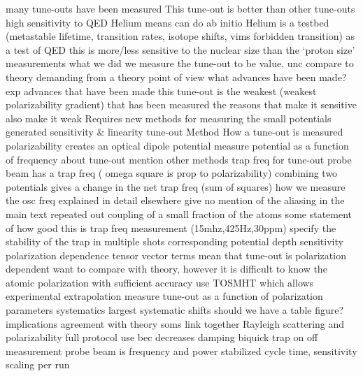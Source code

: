 \documentclass[aps,prl,
,reprint,
superscriptaddress,
onecolumn,
showpacs,preprintnumbers,
 amsmath,amssymb,
]{revtex4-1}
\begin{document}
\begin{outline}[enumerate]
    \2 many tune-outs have been measured
    \2 This tune-out is better than other tune-outs
        \3 high sensitivity to QED
        \3 Helium means can do ab initio
            \4 Helium is a testbed (metastable lifetime, transition rates, isotope shifts, vims forbidden transition)
        \3 as a test of QED this is more/less sensitive to the nuclear size than the `proton size' measurements
\1 what we did
    \2 we measure the tune-out to be
        \3 value, unc
        \3 compare to theory
    \2 demanding from a theory point of view
        \3 what advances have been made?
    \2 exp advances that have been made
        \3 this tune-out is the weakest (weakest polarizability gradient) that has been measured
        \3 the reasons that make it sensitive also make it weak
        \3 Requires new methods for measuring the small potentials generated
        \3 sensitivity \& linearity   
\1 tune-out Method
    \2 How a tune-out is measured
        \3 polarizability creates an optical dipole potential 
        \3 measure potential as a function of frequency about tune-out
        \3 mention other methods
    \2 trap freq for tune-out
        \3 probe beam has a trap freq ( omega square is prop to polarizability)
        \3 combining two potentials gives a change in the net trap freq (sum of squares)
    \2 how we measure the osc freq
        \3 explained in detail elsewhere
        \3 give no mention of the aliasing in the main text
        \3 repeated out coupling of a small fraction of the atoms
        \3 some statement of how good this is 
            \3 trap freq measurement (15mhz,425Hz,30ppm)
            \3 specify the stability of the trap in multiple shots
        \3 corresponding potential depth sensitivity
\1 polarization dependence
    \2 tensor vector terms mean that tune-out is polarization dependent
    \2 want to compare with theory, however it is difficult to know the atomic polarization with sufficient accuracy
    \2 use TOSMHT which allows experimental extrapolation
    \2 measure tune-out as a function of polarization parameters
    \2 
\1 systematics
    \2 largest systematic shifts
    \2 should we have a table figure?
\1 implications
    \2 agreement with theory
\1 soms
    \2 link together Rayleigh scattering and polarizability
    \2 full protocol
        \3 use bec
            \4 decreases damping
        \3 biquick trap
        \3 on off measurement
        \3 probe beam is frequency and power stabilized 
        \3 cycle time, sensitivity scaling per run
    
    
\end{outline}
\end{document}
